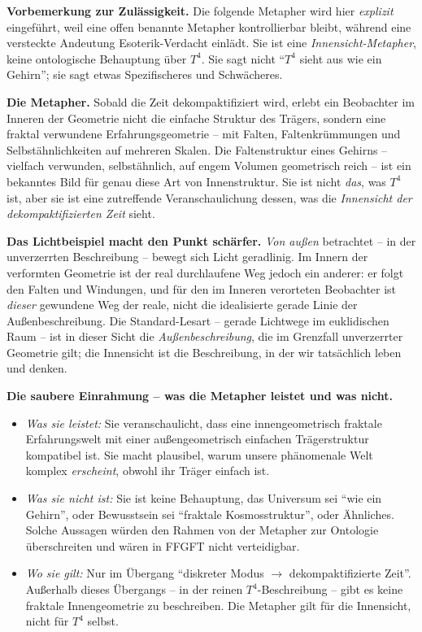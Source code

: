 \textbf{Vorbemerkung zur Zulässigkeit.} Die folgende Metapher wird hier
\emph{explizit} eingeführt, weil eine offen benannte Metapher
kontrollierbar bleibt, während eine versteckte Andeutung Esoterik-Verdacht
einlädt. Sie ist eine \emph{Innensicht-Metapher}, keine ontologische
Behauptung über $T^4$. Sie sagt nicht \enquote{$T^4$ sieht aus wie ein
Gehirn}; sie sagt etwas Spezifischeres und Schwächeres.

\textbf{Die Metapher.} Sobald die Zeit dekompaktifiziert wird, erlebt ein
Beobachter im Inneren der Geometrie nicht die einfache Struktur des
Trägers, sondern eine fraktal verwundene Erfahrungsgeometrie -- mit
Falten, Faltenkrümmungen und Selbstähnlichkeiten auf mehreren Skalen.
Die Faltenstruktur eines Gehirns -- vielfach verwunden, selbstähnlich,
auf engem Volumen geometrisch reich -- ist ein bekanntes Bild für genau
diese Art von Innenstruktur. Sie ist nicht \emph{das}, was $T^4$ ist,
aber sie ist eine zutreffende Veranschaulichung dessen, was die
\emph{Innensicht der dekompaktifizierten Zeit} sieht.

\textbf{Das Lichtbeispiel macht den Punkt schärfer.} \emph{Von außen}
betrachtet -- in der unverzerrten Beschreibung -- bewegt sich Licht
geradlinig. Im Innern der verformten Geometrie ist der real
durchlaufene Weg jedoch ein anderer: er folgt den Falten und
Windungen, und für den im Inneren verorteten Beobachter ist
\emph{dieser} gewundene Weg der reale, nicht die idealisierte
gerade Linie der Außenbeschreibung. Die Standard-Lesart -- gerade
Lichtwege im euklidischen Raum -- ist in dieser Sicht die
\emph{Außenbeschreibung}, die im Grenzfall unverzerrter Geometrie
gilt; die Innensicht ist die Beschreibung, in der wir tatsächlich
leben und denken.

\textbf{Die saubere Einrahmung -- was die Metapher leistet und was
nicht.}

\begin{itemize}[leftmargin=2em,itemsep=2pt,topsep=2pt]
  \item \emph{Was sie leistet:} Sie veranschaulicht, dass eine
        innengeometrisch fraktale Erfahrungswelt mit einer
        außengeometrisch einfachen Trägerstruktur kompatibel ist.
        Sie macht plausibel, warum unsere phänomenale Welt
        komplex \emph{erscheint}, obwohl ihr Träger einfach ist.
  \item \emph{Was sie nicht ist:} Sie ist keine Behauptung, das
        Universum sei \enquote{wie ein Gehirn}, oder Bewusstsein
        sei \enquote{fraktale Kosmosstruktur}, oder Ähnliches.
        Solche Aussagen würden den Rahmen von der Metapher zur
        Ontologie überschreiten und wären in FFGFT nicht
        verteidigbar.
  \item \emph{Wo sie gilt:} Nur im Übergang
        \enquote{diskreter Modus $\to$ dekompaktifizierte Zeit}.
        Außerhalb dieses Übergangs -- in der reinen
        $T^4$-Beschreibung -- gibt es keine fraktale Innengeometrie
        zu beschreiben. Die Metapher gilt für die Innensicht, nicht
        für $T^4$ selbst.
\end{itemize}

